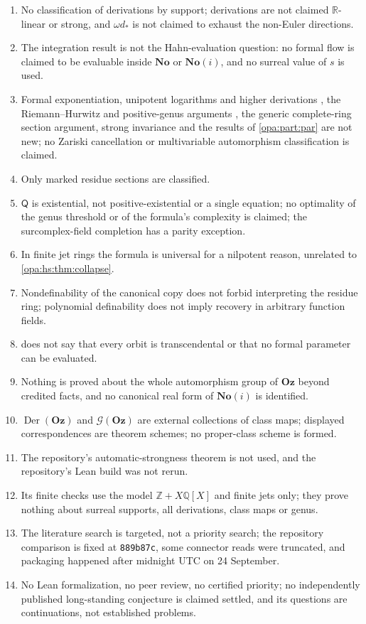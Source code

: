 \documentclass[11pt,oneside]{article}
\numberwithin{equation}{section}
\theoremstyle{definition}
\theoremstyle{remark}
\newcommand{\No}{\mathbf{No}}
\newcommand{\Oz}{\mathbf{Oz}}
\newcommand{\SC}{\mathbf{No}(i)}
\newcommand{\R}{\mathbb R}
\newcommand{\Q}{\mathbb Q}
\newcommand{\Z}{\mathbb Z}
\newcommand{\Der}{\operatorname{Der}}
\begin{document}
\begin{enumerate}[itemsep=1pt]
\item No classification of derivations by support; derivations are not claimed $\R$-linear or strong, and $\omega d_*$ is not claimed to
exhaust the non-Euler directions.
\item The integration result is not the Hahn-evaluation question: no formal flow is claimed to be evaluable inside $\No$ or $\SC$, and no
surreal value of $s$ is used.
\item Formal exponentiation, unipotent logarithms and higher derivations \cite{Hazewinkel,NT,Bagayoko}, the Riemann--Hurwitz and
positive-genus arguments \cite{StacksRH}, the generic complete-ring section argument, strong invariance \cite{Hirano} and the results of
\cref{opa:part:par} are not new; no Zariski cancellation or multivariable automorphism classification is claimed.
\item Only marked residue sections are classified.
\item $\mathsf Q$ is existential, not positive-existential or a single equation; no optimality of the genus threshold or of the formula's
complexity is claimed; the surcomplex-field completion has a parity exception.
\item In finite jet rings the formula is universal for a nilpotent reason, unrelated to \cref{opa:hs:thm:collapse}.
\item Nondefinability of the canonical copy does not forbid interpreting the residue ring; polynomial definability does not imply
recovery in arbitrary function fields.
\item {} does not say that every orbit is transcendental or that no formal parameter can be evaluated.
\item Nothing is proved about the whole automorphism group of $\Oz$ beyond credited facts, and no canonical real form of $\SC$ is
identified.
\item $\Der(\Oz)$ and $\mathcal G(\Oz)$ are external collections of class maps; displayed correspondences are theorem schemes; no proper-class
scheme is formed.
\item The repository's automatic-strongness theorem is not used, and the repository's Lean build was not rerun.
\item Its finite checks use the model $\Z+X\Q[X]$ and finite jets only; they prove nothing about surreal supports, all derivations, class
maps or genus.
\item The literature search is targeted, not a priority search; the repository comparison is fixed at \texttt{889b87c}, some connector
reads were truncated, and packaging happened after midnight UTC on 24 September.
\item No Lean formalization, no peer review, no certified priority; no independently published long-standing conjecture is claimed
settled, and its questions are continuations, not established problems.
\end{enumerate}
\end{document}
